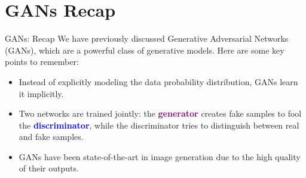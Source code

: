 \section{GANs Recap}
\begin{frame}{GANs: Recap}
We have previously discussed Generative Adversarial Networks (GANs), 
which are a powerful class of generative models. 
Here are some key points to remember:
\begin{itemize}
    \item Instead of explicitly modeling the data probability distribution, GANs learn it implicitly.
    \item<2-> Two networks are trained jointly: the \textcolor{purple}{\textbf{generator}} creates fake samples to fool the \textcolor{blue}{\textbf{discriminator}}, while the discriminator tries to distinguish between real and fake samples.
    \item<3-> GANs have been state-of-the-art in image generation due to the high quality of their outputs.
\end{itemize}
\end{frame}
